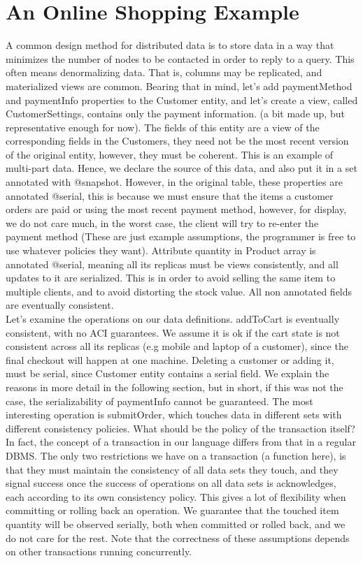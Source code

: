 \section{An Online Shopping Example}
A common design method for distributed data is to store data in a way that
minimizes the number of nodes to be contacted in order to reply to a
query. This often means denormalizing data. That is, columns may be replicated,
and materialized views are common. Bearing that in mind, let's add paymentMethod and paymentInfo 
properties to the Customer entity, and let's create a view, called
CustomerSettings, contains only the payment information. (a bit made up, but
representative enough for now). The fields of this entity are a view of the
corresponding fields in the Customers, they need not be the most recent version
of the original entity, however, they must be coherent. This is an example of 
multi-part data. Hence, we declare the source of this data, and also put it in a
set annotated with @snapshot. However, in the original table, these properties
are annotated @serial, this is because we must ensure that the items a customer
orders are paid or using the most recent payment method, however, for display,
we do not care much, in the worst case, the client will try to re-enter the
payment method (These are just example assumptions, the programmer is free to
use whatever policies they want). Attribute quantity in Product array is
annotated @serial, meaning all its replicas must be views consistently, and all
updates to it are serialized. This is in order to avoid selling the same item to
multiple clients, and to avoid distorting the stock value. All non annotated
fields are eventually consistent. \\

Let's examine the operations on our data definitions. addToCart is eventually
consistent, with no ACI guarantees. We assume it is ok if the cart state is not
consistent across all its replicas (e.g mobile and laptop of a customer), since
the final checkout will happen at one machine. Deleting a customer or adding it,
must be serial, since Customer entity contains a serial field. We explain the
reasons in more detail in the following section, but in short, if this was not
the case, the serializability of paymentInfo cannot be guaranteed. The most
interesting operation is submitOrder, which touches data in different sets with
different consistency policies. What should be the policy of the transaction
itself? In fact, the concept of a transaction in our language differs from that
in a regular DBMS. The only two restrictions we have on a transaction (a function
here), is that they must maintain the consistency of all data sets they touch,
and they signal success once the success of operations on all data sets is
acknowledges, each according to its own consistency policy. This gives a lot of
flexibility when committing or rolling back an operation. We guarantee that the
touched item quantity will be observed serially, both when committed or rolled
back, and we do not care for the rest. Note that the correctness of these
assumptions depends on other transactions running concurrently. 

